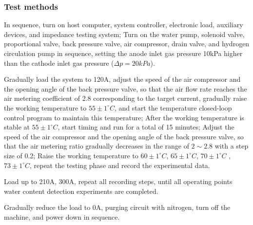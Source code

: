 \subsubsection{Test methods}
In sequence, turn on host computer, system controller, electronic load, auxiliary devices, and impedance testing system; Turn on the water pump, solenoid valve, proportional valve, back pressure valve, air compressor, drain valve, and hydrogen circulation pump in sequence, setting the anode inlet gas pressure 10kPa higher than the cathode inlet gas pressure ($\Delta p=20kPa$).
\par
Gradually load the system to 120A, adjust the speed of the air compressor and the opening angle of the back pressure valve, so that the air flow rate reaches the air metering coefficient of 2.8 corresponding to the target current, gradually raise the working temperature to $55\pm1^{\circ}C$, and start the temperature closed-loop control program to maintain this temperature; After the working temperature is stable at $55\pm1^{\circ}C$, start timing and run for a total of 15 minutes; Adjust the speed of the air compressor and the opening angle of the back pressure valve, so that the air metering ratio gradually decreases in the range of $2 \sim 2.8$ with a step size of 0.2; Raise the working temperature to $60\pm1^{\circ}C$, $65\pm1^{\circ}C$, $70\pm1^{\circ}C$ , $73\pm1^{\circ}C$, repeat the testing phase and record the experimental data.
\par
Load up to 210A, 300A, repeat all recording steps, until all operating points water content detection experiments are completed.
\par
Gradually reduce the load to 0A, purging circuit with nitrogen, turn off the machine, and power down in sequence.
